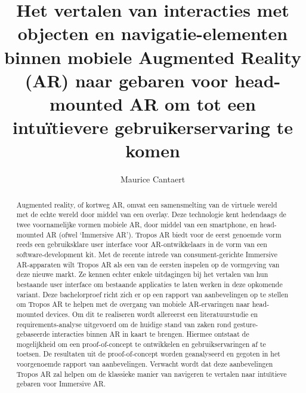\documentclass{hogent-article}
\title{Het vertalen van interacties met objecten en navigatie-elementen binnen mobiele Augmented Reality (AR) naar gebaren voor head-mounted AR om tot een intuïtievere gebruikerservaring te komen}
\author{Maurice Cantaert}
\begin{document}
    \begin{abstract}
        Augmented reality, of kortweg AR, omvat een samensmelting van de virtuele wereld met de echte wereld door middel van een overlay.
        Deze technologie kent hedendaags de twee voornamelijke vormen mobiele AR, door middel van een smartphone, en head-mounted AR (ofwel `Immersive AR').
        Tropos AR biedt voor de eerst genoemde vorm reeds een gebruiksklare user interface voor AR-ontwikkelaars in de vorm van een software-development kit.
        Met de recente intrede van consument-gerichte Immersive AR-apparaten wilt Tropos AR als een van de eersten inspelen op de vormgeving van deze nieuwe markt.
        Ze kennen echter enkele uitdagingen bij het vertalen van hun bestaande user interface om bestaande applicaties te laten werken in deze opkomende variant.
        Deze bachelorproef richt zich er op een rapport van aanbevelingen op te stellen om Tropos AR te helpen met de overgang van mobiele AR-ervaringen naar head-mounted devices.
        Om dit te realiseren wordt allereerst een literatuurstudie en requirements-analyse uitgevoerd om de huidige stand van zaken rond gesture-gebaseerde interacties binnen AR in kaart te brengen.
        Hiermee ontstaat de mogelijkheid om een proof-of-concept te ontwikkelen en gebruikservaringen af te toetsen.
        De resultaten uit de proof-of-concept worden geanalyseerd en gegoten in het voorgenoemde rapport van aanbevelingen.
        Verwacht wordt dat deze aanbevelingen Tropos AR zal helpen om de klassieke manier van navigeren te vertalen naar intu\"{\i}tieve gebaren voor Immersive AR.
    \end{abstract}

    \tableofcontents

    

    \printbibliography[heading=bibintoc]
\end{document}
